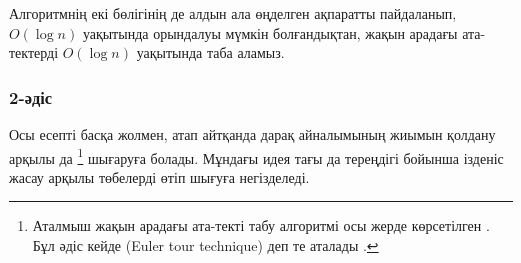 Алгоритмнің екі бөлігінің де алдын ала өңделген
ақпаратты пайдаланып, $O(\log n)$ уақытында орындалуы 
мүмкін болғандықтан, жақын арадағы ата-тектерді $O(\log n)$ 
уақытында таба аламыз.

\subsubsection{2-әдіс}

Осы есепті басқа жолмен, атап айтқанда дарақ айналымының жиымын 
қолдану арқылы да \footnote{Аталмыш жақын арадағы ата-текті табу алгоритмі осы жерде көрсетілген \cite{ben00}. Бұл әдіс кейде  (Euler tour technique) деп те аталады \cite{tar84}.} шығаруға болады.
Мұндағы идея тағы да тереңдігі бойынша ізденіс жасау арқылы төбелерді өтіп шығуға негізделеді.

